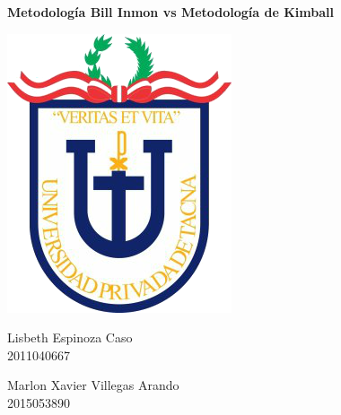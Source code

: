 \documentclass[11pt,a4paper]{article}
\begin{document}
		
		\begin{center}
			\huge \textbf{Metodología Bill Inmon vs Metodología de Kimball} 
		\end{center}
		\vspace{\baselineskip}
		\begin{center}
			\includegraphics[scale=0.37]{./Imagenes/logo}
		\end{center}
		\vspace{\baselineskip}
		\begin{multicols}{2}
			\small
			\begin{center}
			   	\vspace{\baselineskip}
				Lisbeth Espinoza Caso\\
				2011040667\\                
		        
				\vspace{\baselineskip}
		
				Marlon Xavier Villegas Arando\\
				2015053890\\                

			\end{center}
			\normalsize			
		\end{multicols}
		\vspace{\baselineskip}
\end{document}
